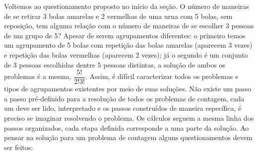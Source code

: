 Voltemos ao questionamento proposto no início da seção. O número de maneiras de se retirar 3 bolas amarelas e 2 vermelhas de uma urna com 5 bolas, sem reposição, tem alguma relação com o número de maneiras de se escolher 3 pessoas de um grupo de 5? Apesar de serem agrupamentos diferentes:  o primeiro temos um agrupamento de 5 bolas com repetição das bolas amarelas (aparecem 3 vezes) e repetição das bolas vermelhas (aparecem 2 vezes); já o segundo é um conjunto de 3 pessoas escolhidas dentre 5 pessoas distintas, a solução de ambos os problemas é a mesma, $\dfrac{5!}{2!3!}.$
Assim, é difícil caracterizar todos os problemas e tipos de agrupamentos existentes por meio de suas soluções. Não existe um passo a passo pré-definido para a resolução de todos os problemas de contagem, cada um deve ser lido, interpretado e os passos construídos de maneira específica, é preciso se imaginar resolvendo o problema. Os cálculos seguem a mesma linha dos passos organizados, cada etapa definida corresponde a uma parte da solução.  Ao pensar na solução para um problema de contagem alguns questionamentos devem ser feitos:

